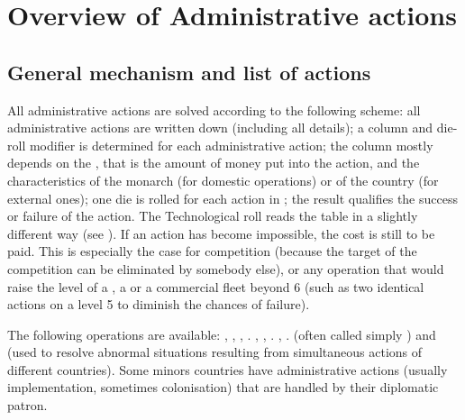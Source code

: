 
\section{Overview of Administrative actions}



\subsection{General mechanism and list of actions}

\aparag[Mechanism] All administrative actions are solved according to the
following scheme: all administrative actions are written down (including all
details); a column and die-roll modifier is determined for each administrative
action; the column mostly depends on the , that is the
amount of money put into the action, and the characteristics of the monarch
(for domestic operations) or of the country (for external ones); one die is
rolled for each action in ; the result
qualifies the success or failure of the action.
\bparag The Technological roll reads the table in a slightly different way
(see ).
\bparag If an action has become impossible, the cost is still to be paid. This
is especially the case for competition (because the target of the competition
can be eliminated by somebody else), or any operation that would raise the
level of a \COL, a \TP or a commercial fleet beyond 6 (such as two identical
actions on a level 5 \COL to diminish the chances of failure).

\label{chExpenses:Administrative Actions}
The following operations are available:
 , , , .
 ,
, .
 ,
.
\bparag[Competitions:]  (often called simply
) and  (used to resolve
abnormal situations resulting from simultaneous actions of different
countries).
 Some minors countries have administrative
actions (usually \TradeFLEET implementation, sometimes colonisation) that are
handled by their diplomatic patron.

